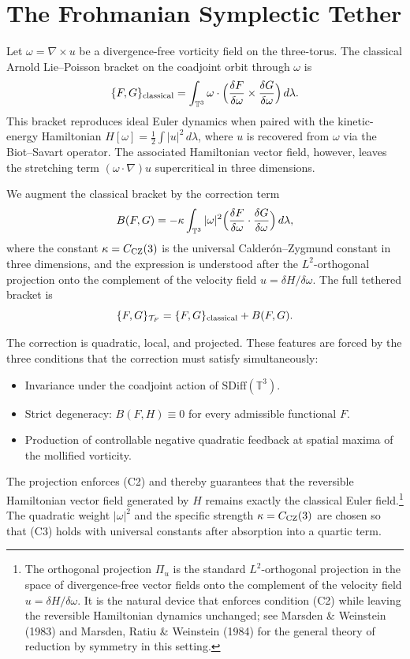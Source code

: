 \documentclass[11pt,a4paper]{article}
\begin{document}
\section{The Frohmanian Symplectic Tether}

Let \(\omega = \nabla \times u\) be a divergence-free vorticity field on the three-torus. The classical Arnold Lie--Poisson bracket on the coadjoint orbit through \(\omega\) is
\[
\{F, G\}_{\rm classical} = \int_{\mathbb{T}^3} \omega \cdot \Bigl( \frac{\delta F}{\delta \omega} \times \frac{\delta G}{\delta \omega} \Bigr) \, d\lambda.
\]
This bracket reproduces ideal Euler dynamics when paired with the kinetic-energy Hamiltonian \(H[\omega] = \frac12 \int |u|^2 \, d\lambda\), where \(u\) is recovered from \(\omega\) via the Biot--Savart operator. The associated Hamiltonian vector field, however, leaves the stretching term \((\omega \cdot \nabla)u\) supercritical in three dimensions.

We augment the classical bracket by the correction term
\[
B(F, G) = -\kappa \int_{\mathbb{T}^3} |\omega|^2 \Bigl( \frac{\delta F}{\delta \omega} \cdot \frac{\delta G}{\delta \omega} \Bigr) \, d\lambda,
\]
where the constant \(\kappa = C_{\rm CZ}(3)\) is the universal Calderón--Zygmund constant in three dimensions, and the expression is understood after the \(L^2\)-orthogonal projection onto the complement of the velocity field \(u = \delta H / \delta \omega\). The full tethered bracket is
\[
\{F, G\}_{\mathcal{T}_F} = \{F, G\}_{\rm classical} + B(F, G).
\]

The correction is quadratic, local, and projected. These features are forced by the three conditions that the correction must satisfy simultaneously:

\begin{itemize}
\item[(C1)] Invariance under the coadjoint action of \(\mathrm{SDiff}(\mathbb{T}^3)\).
\item[(C2)] Strict degeneracy: \(B(F, H) \equiv 0\) for every admissible functional \(F\).
\item[(C3)] Production of controllable negative quadratic feedback at spatial maxima of the mollified vorticity.
\end{itemize}

The projection enforces (C2) and thereby guarantees that the reversible Hamiltonian vector field generated by \(H\) remains exactly the classical Euler field.\footnote{The orthogonal projection \(\Pi_u\) is the standard \(L^2\)-orthogonal projection in the space of divergence-free vector fields onto the complement of the velocity field \(u = \delta H / \delta \omega\). It is the natural device that enforces condition (C2) while leaving the reversible Hamiltonian dynamics unchanged; see Marsden \& Weinstein (1983) and Marsden, Ratiu \& Weinstein (1984) for the general theory of reduction by symmetry in this setting.} The quadratic weight \(|\omega|^2\) and the specific strength \(\kappa = C_{\rm CZ}(3)\) are chosen so that (C3) holds with universal constants after absorption into a quartic term.
\end{document}
